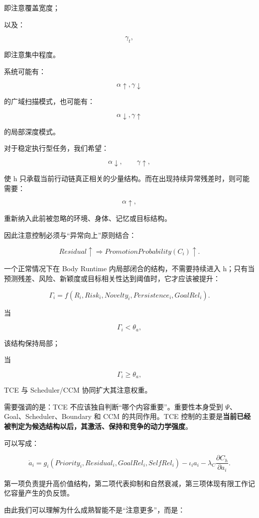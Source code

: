 即注意覆盖宽度；

以及：

\[
\gamma_t,
\]

即注意集中程度。

系统可能有：

\[
\alpha\uparrow,\gamma\downarrow
\]

的广域扫描模式，也可能有：

\[
\alpha\downarrow,\gamma\uparrow
\]

的局部深度模式。

对于稳定执行型任务，我们希望：

\[
\alpha\downarrow,
\qquad
\gamma\uparrow,
\]

使 h 只承载当前行动链真正相关的少量结构。而在出现持续异常残差时，则可能需要：

\[
\alpha\uparrow,
\]

重新纳入此前被忽略的环境、身体、记忆或目标结构。

因此注意控制必须与“异常向上”原则结合：

\[
Residual\uparrow
\Rightarrow
PromotionProbability(C_i)\uparrow.
\]

一个正常情况下在 Body Runtime 内局部闭合的结构，不需要持续进入 h；只有当预测残差、风险、新颖度或目标相关性达到阈值时，它才应该被提升：

\[
\Gamma_i
=
f(
R_i,
Risk_i,
Novelty_i,
Persistence_i,
GoalRel_i
).
\]

当

\[
\Gamma_i<\theta_a,
\]

该结构保持局部；

当

\[
\Gamma_i\ge\theta_a,
\]

TCE 与 Scheduler/CCM 协同扩大其注意权重。

需要强调的是：TCE 不应该独自判断“哪个内容重要”。重要性本身受到 $\Psi$、Goal、Scheduler、Boundary 和 CCM 的共同作用。TCE 控制的主要是\textbf{当前已经被判定为候选结构以后，其激活、保持和竞争的动力学强度}。

可以写成：

\[
\dot a_i
=
g_i
\left(
Priority_i,
Residual_i,
GoalRel_i,
SelfRel_i
\right)
-
\iota_i a_i
-
\lambda_C\frac{\partial C_h}{\partial a_i}.
\]

第一项负责提升高价值结构，第二项代表抑制和自然衰减，第三项体现有限工作记忆容量产生的负反馈。

由此我们可以理解为什么成熟智能不是“注意更多”，而是：

\begin{statementbox}
\centering
{}
\end{statementbox}


